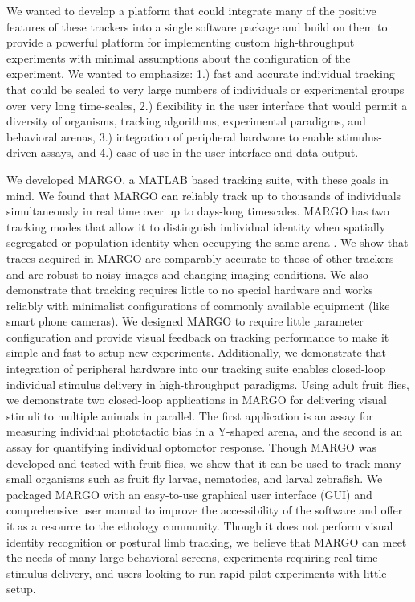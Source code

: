 \documentclass[10pt]{article}
\begin{document}
\begin{multicols}{2}
We wanted to develop a platform that could integrate many of the positive features of these trackers into a single software package and build on them to provide a powerful platform for implementing custom high-throughput experiments with minimal assumptions about the configuration of the experiment. We wanted to emphasize: 1.) fast and accurate individual tracking that could be scaled to very large numbers of individuals or experimental groups over very long time-scales, 2.) flexibility in the user interface that would permit a diversity of organisms, tracking algorithms, experimental paradigms, and behavioral arenas, 3.) integration of peripheral hardware to enable stimulus-driven assays, and  4.) ease of use in the user-interface and data output. 

We developed MARGO, a MATLAB based tracking suite, with these goals in mind. We found that MARGO can reliably track up to thousands of individuals simultaneously in real time over up to days-long timescales. MARGO has two tracking modes that allow it to distinguish individual identity when spatially segregated or population identity when occupying the same arena . We show that traces acquired in MARGO are comparably accurate to those of other trackers and are robust to noisy images and changing imaging conditions. We also demonstrate that tracking requires little to no special hardware and works reliably with minimalist configurations of commonly available equipment (like smart phone cameras). We designed MARGO to require little parameter configuration and provide visual feedback on tracking performance to make it simple and fast to setup new experiments. Additionally, we demonstrate that integration of peripheral hardware into our tracking suite enables closed-loop individual stimulus delivery in high-throughput paradigms. Using adult fruit flies, we demonstrate two closed-loop applications in MARGO for delivering visual stimuli to multiple animals in parallel. The first application is an assay for measuring individual phototactic bias in a Y-shaped arena, and the second is an assay for quantifying individual optomotor response. Though MARGO was developed and tested with fruit flies, we show that it can be used to track many small organisms such as fruit fly larvae, nematodes, and larval zebrafish. We packaged MARGO with an easy-to-use graphical user interface (GUI) and comprehensive user manual to improve the accessibility of the software and offer it as a resource to the ethology community. Though it does not perform visual identity recognition or postural limb tracking, we believe that MARGO can meet the needs of many large behavioral screens, experiments requiring real time stimulus delivery, and users looking to run rapid pilot experiments with little setup.


\end{multicols}
\end{document}
